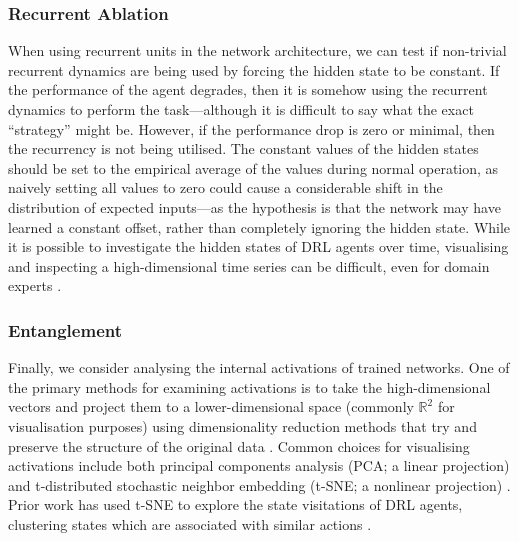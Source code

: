 \hypertarget{recurrent-ablation}{%
\subsubsection{Recurrent Ablation}\label{recurrent-ablation}}

\label{sec:recurrent_abl}

When using recurrent units in the network architecture, we can test if
non-trivial recurrent dynamics are being used by forcing the hidden
state to be constant. If the performance of the agent degrades, then it
is somehow using the recurrent dynamics to perform the task---although
it is difficult to say what the exact ``strategy'' might be. However, if
the performance drop is zero or minimal, then the recurrency is not
being utilised. The constant values of the hidden states should be set
to the empirical average of the values during normal operation, as
naively setting all values to zero could cause a considerable shift in
the distribution of expected inputs---as the hypothesis is that the
network may have learned a constant offset, rather than completely
ignoring the hidden state. {While it is possible to investigate the hidden states of DRL agents over time, visualising and inspecting a high-dimensional time series can be difficult, even for domain experts}
\cite{jaunet2020drlviz}.

\hypertarget{entanglement}{%
\subsubsection{Entanglement}\label{entanglement}}

\label{sec:act_an}

Finally, we consider analysing the internal activations of trained
networks. One of the primary methods for examining activations is to
take the high-dimensional vectors and project them to a
lower-dimensional space (commonly \(\mathbb{R}^2\) for visualisation
purposes) using dimensionality reduction methods that try and preserve
the structure of the original data \cite{rauber2017visualizing}. Common
choices for visualising activations include both principal components
analysis (PCA; a linear projection)
\cite{elman1989representation, pearson1901liii} and t-distributed
stochastic neighbor embedding (t-SNE; a nonlinear projection)
\cite{hamel2010learning, maaten2008visualizing, mnih2015human}. {Prior work has used t-SNE to explore the state visitations of DRL agents, clustering states which are associated with similar actions}
\cite{mnih2015human, zahavy2016graying}.

